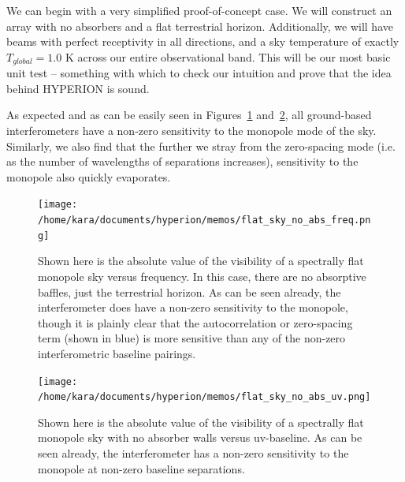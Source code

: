 We can begin with a very simplified proof-of-concept case. We will construct an 
array with no absorbers and a flat terrestrial horizon. Additionally, we will 
have beams with perfect receptivity in all directions, and a sky temperature of 
exactly $T_{global} = 1.0$ K across our entire observational band. This will be 
our most basic unit test -- something with which to check our intuition and 
prove that the idea behind HYPERION is sound.

As expected and  as can be easily seen in 
Figures~\ref{fig:flat-sky-no-abs-freq} and~\ref{fig:flat-sky-no-abs-uv}, all 
ground-based interferometers have a non-zero sensitivity to the monopole mode 
of the sky. Similarly, we also find that the further we stray from the 
zero-spacing mode (i.e. as the number of wavelengths of separations increases), 
sensitivity to the monopole also quickly evaporates.

\begin{figure}
    \begin{center}
    \texttt{[image: /home/kara/documents/hyperion/memos/flat\_sky\_no\_abs\_freq.png]}
    \end{center}
    \caption{
        Shown here is the absolute value of the visibility of a spectrally flat 
        monopole sky versus frequency. In this case, there are no absorptive 
        baffles, just the terrestrial horizon. As can be seen already, the 
        interferometer does have a non-zero sensitivity to the monopole, though 
        it is plainly clear that the autocorrelation or zero-spacing term 
        (shown in blue) is more sensitive than any of the non-zero 
        interferometric baseline pairings.
    }
    \label{fig:flat-sky-no-abs-freq}
\end{figure}

\begin{figure}
    \begin{center}
    \texttt{[image: /home/kara/documents/hyperion/memos/flat\_sky\_no\_abs\_uv.png]}
    \end{center}
    \caption{
        Shown here is the absolute value of the visibility of a spectrally flat 
        monopole sky with no absorber walls versus uv-baseline. As can be seen 
        already, the interferometer has a non-zero sensitivity to the monopole 
        at non-zero baseline separations.
    }
    \label{fig:flat-sky-no-abs-uv}
\end{figure}

